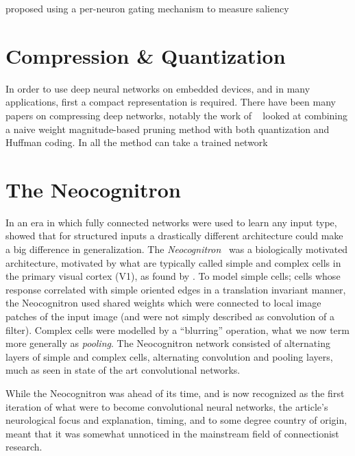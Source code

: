 \documentclass[thesis]{subfiles}
\begin{document}
    \citet{hanson1989comparing} proposed using a per-neuron gating mechanism to measure saliency
    
	\citet{lecun1989optimal,sietsma1988neural,han2015deep,ullrich2017soft,}
    \section{Compression \& Quantization}
    In order to use deep neural networks on embedded devices, and in many applications, first a compact representation is required. There have been many papers on compressing deep networks, notably the work of ~\citep{han2016dsd} looked at combining a naive weight magnitude-based pruning method with both quantization and Huffman coding. In all the method can take a trained network
	
\section{The Neocognitron}
	In an era in which fully connected networks were used to learn any input type, \citet{Fuk80} showed that for structured inputs a drastically different architecture could make a big difference in generalization. The \emph{Neocognitron}~\citep{Fuk80, fukushima2013artificial} was a biologically motivated architecture, motivated by what are typically called simple and complex cells in the primary visual cortex (V1), as found by \citet{Hubel1959a}. To model simple cells; cells whose response correlated with simple oriented edges in a translation invariant manner, the Neocognitron used shared weights which were connected to local image patches of the input image (and were not simply described as convolution of a filter). Complex cells were modelled by a ``blurring'' operation, what we now term more generally as \emph{pooling}. The Neocognitron network consisted of alternating layers of simple and complex cells, \ie alternating convolution and pooling layers, much as seen in state of the art convolutional networks.

	While the Neocognitron was ahead of its time, and is now recognized as the first iteration of what were to become convolutional neural networks, the article's neurological focus and explanation, timing, and to some degree country of origin, meant that it was somewhat unnoticed in the mainstream field of connectionist research. %
	
\end{document}
